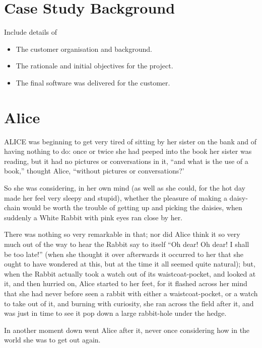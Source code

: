 \documentclass{l3proj}
\begin{document}
\section{Case Study Background}

Include details of 

\begin{itemize}
\item The customer organisation and background.
\item The rationale and initial objectives for the project.
\item The final software was delivered for the customer.
\end{itemize}

\section{Alice}
\label{sec:alice}

ALICE \cite{alice} was beginning to get very tired of sitting by her sister
on the bank and of having nothing to do: once or twice she had peeped into
the book her sister was reading, but it had no pictures or conversations in
it, ``and what is the use of a book,'' thought Alice, ``without pictures or
conversations?'

So she was considering, in her own mind (as well as she could, for the hot
day made her feel very sleepy and stupid), whether the pleasure of making a
daisy-chain would be worth the trouble of getting up and picking the
daisies, when suddenly a White Rabbit with pink eyes ran close by her.

There was nothing so very remarkable in that; nor did Alice think it so
very much out of the way to hear the Rabbit say to itself ``Oh dear! Oh
dear! I shall be too late!'' (when she thought it over afterwards it
occurred to her that she ought to have wondered at this, but at the time it
all seemed quite natural); but, when the Rabbit actually took a watch out
of its waistcoat-pocket, and looked at it, and then hurried on, Alice
started to her feet, for it flashed across her mind that she had never
before seen a rabbit with either a waistcoat-pocket, or a watch to take out
of it, and burning with curiosity, she ran across the field after it, and
was just in time to see it pop down a large rabbit-hole under the hedge.

In another moment down went Alice after it, never once considering how in
the world she was to get out again.
\end{document}
